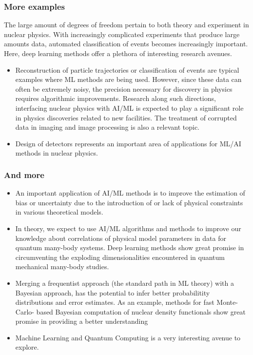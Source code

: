 \documentclass{beamer}
\begin{document}
\begin{frame}
\frametitle{More examples}

The large amount of degrees of freedom pertain to both theory and experiment in nuclear physics. With increasingly complicated experiments that produce large amounts data, automated classification of events becomes increasingly important. Here, deep learning methods offer a plethora of interesting research avenues. 

\begin{block}{}
\begin{itemize}
\item Reconstruction of particle trajectories or classification of events are typical examples where ML methods are being used. However, since these data can often be extremely noisy, the precision necessary for discovery in physics requires algorithmic improvements. Research along such directions, interfacing nuclear physics with AI/ML is expected to play a significant role in physics discoveries related to new facilities.  The treatment of corrupted data in imaging and image processing is also a relevant topic. 

\item Design of detectors represents an important area of applications for ML/AI methods in nuclear physics.
\end{itemize}

\noindent
\end{block}
\end{frame}

\begin{frame}
\frametitle{And more}

\begin{block}{}
\begin{itemize}
\item An important application of AI/ML methods is to improve the estimation of bias or uncertainty due to the introduction of or lack of physical constraints in various theoretical models.

\item In theory, we expect to use AI/ML algorithms and methods to improve our knowledge about  correlations of physical model parameters in data for quantum many-body systems. Deep learning methods show great promise in circumventing the exploding dimensionalities encountered in quantum mechanical many-body studies. 

\item Merging a frequentist approach (the standard path in ML theory) with a Bayesian approach, has the potential to infer better probabilitity distributions and error estimates. As an example, methods for fast Monte-Carlo- based Bayesian computation of nuclear density functionals show great promise in providing a better understanding 

\item Machine Learning and Quantum Computing is a very interesting avenue to explore. 
\end{itemize}

\noindent
\end{block}
\end{frame}
\end{document}
